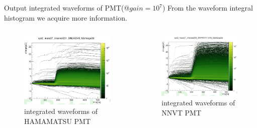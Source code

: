 \begin{frame}{Output integrated waveforms of PMT(@$gain=10^7$)}
From the waveform integral histogram we acquire more information.
\begin{columns}
\begin{column}{.5\textwidth}
\begin{figure}
\centering
\includegraphics[width=\textwidth]{figures/hambaseline2d.png} %
\caption{integrated waveforms of HAMAMATSU PMT}
\end{figure}
\end{column}
\begin{column}{.5\textwidth}
\begin{figure}
\centering
\includegraphics[width=\textwidth]{figures/mcpbaseline2d.png} %
\caption{integrated waveforms of NNVT PMT}
\end{figure}
\end{column}
\end{columns}
\end{frame}
